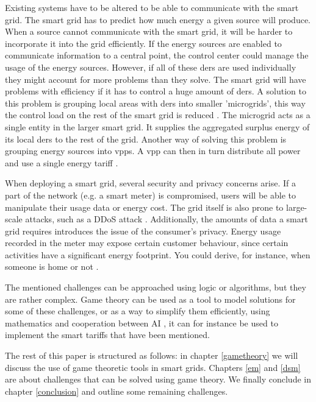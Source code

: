 Existing systems have to be altered to be able to communicate with the smart grid.  The smart grid has to predict how much energy a given source will produce. When a source cannot communicate with the smart grid, it will be harder to incorporate it into the grid efficiently. If the energy sources are enabled to communicate information to a central point, the control center could manage the usage of the energy sources. However, if all of these \acp{der}  are used individually they might account for more problems than they solve. The smart grid will have problems with efficiency if it has to control a huge amount of \acp{der}. A solution to this problem is grouping local areas with \acp{der} into smaller 'microgrids', this way the control load on the rest of the smart grid is reduced \cite{HatziargyriouAsanoIravaniMarnay2007}. The microgrid acts as a single entity in the larger smart grid. It supplies the aggregated surplus energy of its local \acp{der} to the rest of the grid. Another way of solving this problem is grouping energy sources into \acp{vpp}. A \ac{vpp} can then in turn distribute all power and use a single energy tariff \cite{NikonowiczMilewski2012}.

When deploying a smart grid, several security and privacy concerns arise.  If a part of the network (e.g. a smart meter) is compromised, users will be able to manipulate their usage data or energy cost. The grid itself is also prone to large-scale attacks, such as a DDoS attack \cite{McDanielMcLaughlin2009a}. Additionally, the amounts of data a smart grid requires introduces the issue of the consumer's privacy. Energy usage recorded in the meter may expose certain customer behaviour, since certain activities have a significant energy footprint. You could derive, for instance, when someone is home or not \cite{Molina-MarkhamShenoyFuEtAl2010}.

The mentioned challenges can be approached using logic or algorithms, but they are rather complex. Game theory can be used as a tool to model solutions for some of these challenges, or as a way to simplify them efficiently, using mathematics and cooperation between AI \cite{myerson2013game}, it can for instance be used to implement the smart tariffs that have been mentioned. 

The rest of this paper is structured as follows: in chapter \ref{gametheory} we will discuss the use of game theoretic tools in smart grids. Chapters \ref{em} and \ref{dsm} are about challenges that can be solved using game theory. We finally conclude in chapter \ref{conclusion} and outline some remaining challenges.